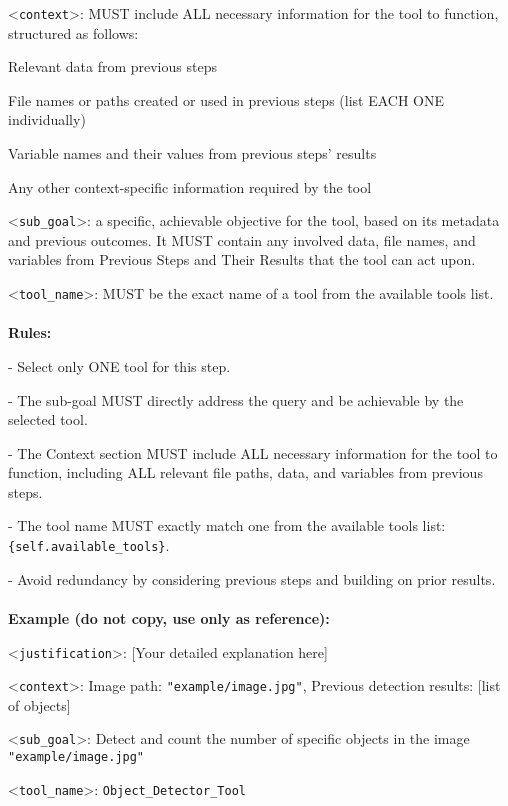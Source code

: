 \begin{textcolorbox}
\textless{}\texttt{context}\textgreater{}: MUST include ALL necessary information for the tool to function, structured as follows:

\quad * Relevant data from previous steps
    
\quad * File names or paths created or used in previous steps (list EACH ONE individually)
    
\quad * Variable names and their values from previous steps' results
    
\quad * Any other context-specific information required by the tool
    
\textless{}\texttt{sub\_goal}\textgreater{}: a specific, achievable objective for the tool, based on its metadata and previous outcomes. It MUST contain any involved data, file names, and variables from Previous Steps and Their Results that the tool can act upon.

\textless{}\texttt{tool\_name}\textgreater{}: MUST be the exact name of a tool from the available tools list.
\\\\
\textbf{Rules:}

\quad - Select only ONE tool for this step.

\quad - The sub-goal MUST directly address the query and be achievable by the selected tool.

\quad - The Context section MUST include ALL necessary information for the tool to function, including ALL relevant file paths, data, and variables from previous steps.

\quad - The tool name MUST exactly match one from the available tools list: \texttt{\{self.available\_tools\}}.

\quad - Avoid redundancy by considering previous steps and building on prior results.
\\\\
\textbf{Example (do not copy, use only as reference):}

\textless{}\texttt{justification}\textgreater{}: [Your detailed explanation here]

\textless{}\texttt{context}\textgreater{}: Image path: \texttt{"example/image.jpg"}, Previous detection results: [list of objects]

\textless{}\texttt{sub\_goal}\textgreater{}: Detect and count the number of specific objects in the image \texttt{"example/image.jpg"}

\textless{}\texttt{tool\_name}\textgreater{}: \texttt{Object\_Detector\_Tool}
\end{textcolorbox}
